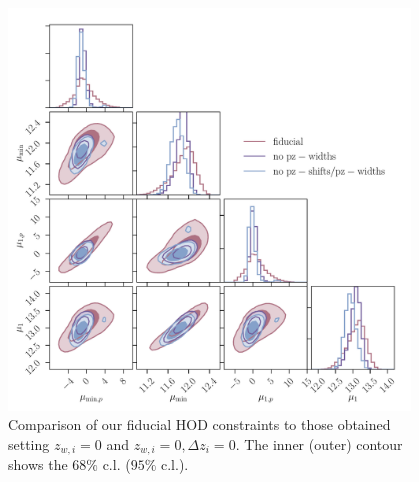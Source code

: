 \documentclass[a4paper,11pt]{article}
\begin{document}
      \begin{figure}
        \begin{center}
          \includegraphics[width=0.95\textwidth]{figures/contours-Mmin-M1_mPk=HOD_fix=alpha-fc-sigmaM_HOD=zevol_fit=pz-shifts-pz-widths+prior=0p2_fit=auto+cross_cosmo=const_cov=G+NG+SSC-LINBIAS_HOD-param=zfid_clfit=HOD-zevol_fit=pz-shifts+widths-vs-fit=pz-shifts-vs-no-pz-shifts.pdf}
          \caption{Comparison of our fiducial HOD constraints to those obtained setting $z_{w, i} = 0$ and $z_{w, i} = 0, \Delta z_{i} = 0$. The inner (outer) contour shows the $68 \%$ c.l. ($95 \%$ c.l.).}
          \label{fig:constraints-hod-pz-shifts-pz-widths-vs-pz-shifts-vs-no-pz-shifts}
        \end{center}
      \end{figure}
\end{document}
